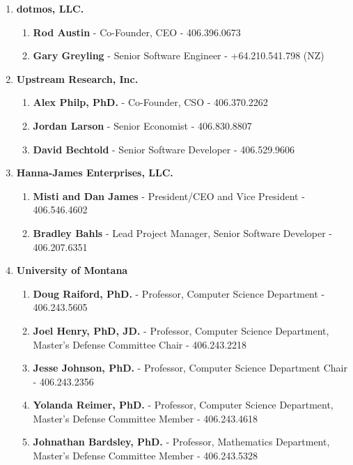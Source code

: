 \documentclass[oneside]{article}%
\begin{document}
\begin{enumerate}[]
	\item \large \textbf{dotmos, LLC.} \small
		\begin{enumerate}[]
			\item \textbf{Rod Austin} - Co-Founder, CEO - 406.396.0673
			\item \textbf{Gary Greyling} - Senior Software Engineer - +64.210.541.798 (NZ)
		\end{enumerate}
	\item \large \textbf{Upstream Research, Inc.} \small
		\begin{enumerate}[]
			\item \textbf{Alex Philp, PhD.} - Co-Founder, CSO - 406.370.2262
			\item \textbf{Jordan Larson} - Senior Economist - 406.830.8807
			\item \textbf{David Bechtold} - Senior Software Developer - 406.529.9606
		\end{enumerate}
	\item \large \textbf{Hanna-James Enterprises, LLC.} \small
		\begin{enumerate}[]
			\item \textbf{Misti and Dan James} - President/CEO and Vice President - 406.546.4602
			\item \textbf{Bradley Bahls} - Lead Project Manager, Senior Software Developer - 406.207.6351
		\end{enumerate}
	\item \large \textbf{University of Montana} \small
		\begin{enumerate}[]
			\item \textbf{Doug Raiford, PhD.} - Professor, Computer Science Department - 406.243.5605
			\item \textbf{Joel Henry, PhD, JD.} - Professor, Computer Science Department, Master's Defense Committee Chair - 406.243.2218
			\item \textbf{Jesse Johnson, PhD.} - Professor, Computer Science Department Chair - 406.243.2356
			\item \textbf{Yolanda Reimer, PhD.} - Professor, Computer Science Department, Master's Defense Committee Member - 406.243.4618
			\item \textbf{Johnathan Bardsley, PhD.} - Professor, Mathematics Department, Master's Defense Committee Member - 406.243.5328
		\end{enumerate}
\end{enumerate}
\end{document}

